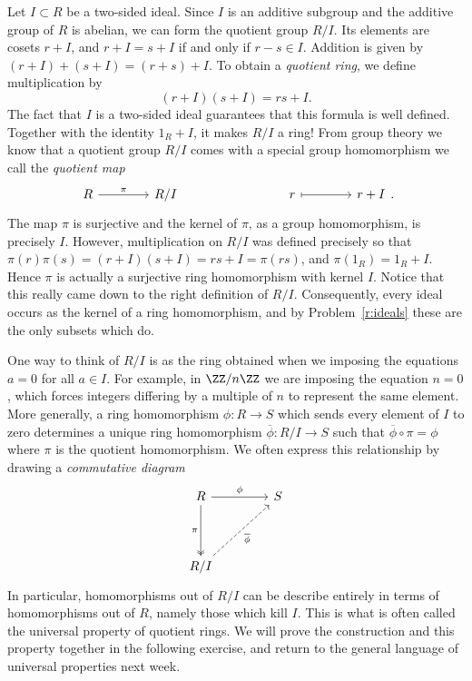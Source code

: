 \documentclass[12pt,reqno]{amsart}
\begin{document}
\hrulefill
 
 
Let $I\subset R$ be a two-sided ideal. Since $I$ is an additive subgroup and the additive group of $R$ is abelian, we can form the quotient group $R/I$. Its elements are cosets $r+I$, and $r+I=s+I$ if and only if $r-s\in I$. Addition is given by $(r+I)+(s+I)=(r+s)+I$. To obtain a \emph{quotient ring}, we define multiplication by
\[
 (r+I)(s+I)=rs+I.
\]
The fact that $I$ is a two-sided ideal guarantees that this formula is well defined. Together with the identity $1_R+I$, it makes $R/I$ a ring!  From group theory we know that a quotient group $R/I$ comes with a special group homomorphism we call the \emph{quotient map}
 \[
 \begin{tikzcd}[row sep = .3em, column sep = 4em]
 R \arrow[r, "\pi"] & R/I & & r \arrow[r, mapsto] & r+I
 \end{tikzcd}.
 \]
 The map $\pi$ is surjective and the kernel of $\pi$, as a group homomorphism, is precisely $I$. However, multiplication on $R/I$ was defined precisely so that $\pi(r)\pi(s)=(r+I)(s+I)=rs+I=\pi(rs)$, and $\pi(1_R)=1_R+I$. Hence $\pi$ is actually a surjective ring homomorphism with kernel $I$. Notice that this really came down to the right definition of $R/I$. Consequently, every ideal occurs as the kernel of a ring homomorphism, and by Problem~\ref{r:ideals} these are the only subsets which do.
 
One way to think of $R/I$ is as the ring obtained when we imposing the equations $a=0$ for all $a\in I$. For example, in $\ZZ/n\ZZ$ we are imposing the equation $n=0$, which forces integers differing by a multiple of $n$ to represent the same element. More generally, a ring homomorphism $\phi:R\to S$ which sends every element of $I$ to zero determines a unique ring homomorphism $\overline{\phi}:R/I\to S$ such that $\overline{\phi}\circ\pi=\phi$ where $\pi$ is the quotient homomorphism. We often express this relationship by drawing a \emph{commutative diagram}
\[
\begin{tikzcd}[column sep=4em,row sep=4em]
R \arrow[r,"\phi"] \arrow[d,two heads,"\pi"'] & S \\
R/I \arrow[ur,dashed,"\overline\phi"'] &
\end{tikzcd}
\]
In particular, homomorphisms out of $R/I$ can be describe entirely in terms of homomorphisms out of $R$, namely those which kill $I$. This is what is often called the universal property of quotient rings. We will prove the construction and this property together in the following exercise, and return to the general language of universal properties next week.
 
\end{document}
